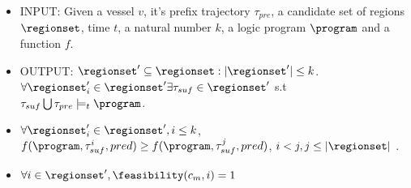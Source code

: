 \begin{itemize}
    \item  
    
    INPUT: Given a vessel $v$, it's prefix trajectory $\tau_{pre}$,  a candidate set of regions $\regionset$, time $t$, a natural number $k$, a logic program $\program$ and a function $f$.

    \item 
    OUTPUT: $\regionset' \subseteq \regionset : | \regionset' | \leq k$.  $\forall \regionset'_i \in \regionset' \exists \tau_{suf} \in \regionset'$   s.t $\tau_{suf} \bigcup \tau_{pre} \models_t \program$.
    \item $\forall \regionset'_i \in \regionset', i \leq k$, $f(\program, \tau_{suf}^i, pred) \geq f(\program, \tau_{suf}^j, pred) $, $i < j, j \leq |\regionset|$ .

    \item $\forall i \in \regionset', \feasibility(c_m,i) = 1$

\end{itemize}





